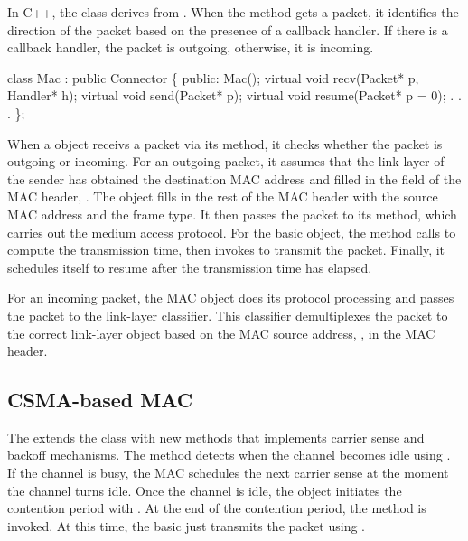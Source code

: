 In C++, the  class derives from .  When the
 method gets a packet, it identifies the direction of the
packet based on the presence of a callback handler.  If there is a
callback handler, the packet is outgoing, otherwise, it is incoming.

\begin{program}
   class Mac : public Connector \{
   public:
        Mac();
        virtual void recv(Packet* p, Handler* h);
        virtual void send(Packet* p);
        virtual void resume(Packet* p = 0);
                . . .
    \};
\end{program}

When a  object receivs a packet via its  method,
it checks whether the packet is outgoing or incoming.  For an outgoing
packet, it assumes that the link-layer of the sender has obtained the
destination MAC address and filled in the  field of the
MAC header, .  The  object fills in the rest of
the MAC header with the source MAC address and the frame type.  It then
passes the packet to its  method, which carries out the
medium access protocol.  For the basic  object, the
 method calls  to compute the transmission
time, then invokes  to transmit the packet.  
Finally, it 
schedules itself to resume after the transmission time has elapsed.

For an incoming packet, the MAC object does its protocol processing and
passes the packet to the link-layer classifier.  This classifier
demultiplexes the packet to the correct link-layer object based on the
MAC source address, , in the MAC header.

\subsection{CSMA-based MAC}

The  extends the  class
with new methods that implements carrier sense and backoff mechanisms.
The  method detects when the channel becomes idle
using .  If the channel is busy, the MAC
schedules the next carrier sense at the moment the channel turns idle.
Once the channel is idle, the  object initiates the
contention period with .  At the end of the
contention period, the  method is invoked.  At
this time, the basic  just transmits the packet using
.

